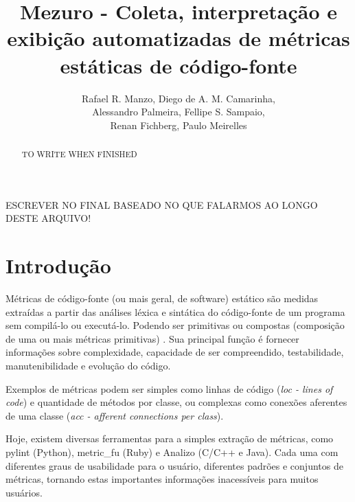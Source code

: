 \documentclass[12pt]{article}
\begin{document}
\sloppy

\title{Mezuro - Coleta, interpretação e exibição automatizadas de métricas estáticas de código-fonte}

\author{Rafael R. Manzo, Diego de A. M. Camarinha,\\
        Alessandro Palmeira, Fellipe S. Sampaio,\\
        Renan Fichberg, Paulo Meirelles}


\address{Instituto de Matemática e Estatística -- Universidade de São Paulo (USP)\\
  Rua do Matão, 1010 -- 05508-090 -- Cidade Universitária -- São Paulo -- SP -- Brasil
\nextinstitute
  Faculdade de Engenharia -- UnB Gama (FGA)\\
  Gama -- DF -- Brasil
}


\maketitle

\begin{abstract}
  TO WRITE WHEN FINISHED
\end{abstract}

\begin{resumo}
  ESCREVER NO FINAL BASEADO NO QUE FALARMOS AO LONGO DESTE ARQUIVO!
\end{resumo}

\section{Introdução} \label{sec:intro}
Métricas de código-fonte (ou mais geral, de software) estático são medidas extraídas a partir das análises léxica e sintática do código-fonte de um programa sem compilá-lo ou executá-lo. Podendo ser primitivas ou compostas (composição de uma ou mais métricas primitivas) \cite{m13}. Sua principal função é fornecer informações sobre complexidade, capacidade de ser compreendido, testabilidade, manutenibilidade e evolução do código\cite{m13}.

Exemplos de métricas podem ser simples como linhas de código (\textit{loc - lines of code}) e quantidade de métodos por classe, ou complexas como conexões aferentes de uma classe (\textit{acc - afferent connections per class}).

Hoje, existem diversas ferramentas para a simples extração de métricas, como pylint (Python), metric\_fu (Ruby) e Analizo (C/C++ e Java). Cada uma com diferentes graus de usabilidade para o usuário, diferentes padrões e conjuntos de métricas, tornando estas importantes informações inacessíveis para muitos usuários.
\end{document}
